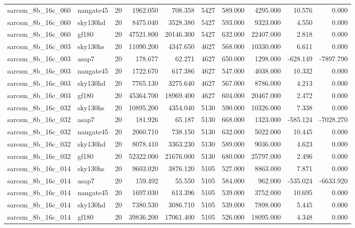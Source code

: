 \begin{tabular}{llrrrrrrrr}
sarcsm\_8b\_16c\_060 & nangate45 & 20 & 1962.050 & 708.358 & 5427 & 589.000 & 4295.000 & 10.576 & 0.000 \\
sarcsm\_8b\_16c\_060 & sky130hd & 20 & 8475.040 & 3528.380 & 5427 & 593.000 & 9323.000 & 4.550 & 0.000 \\
sarcsm\_8b\_16c\_060 & gf180 & 20 & 47521.800 & 20146.300 & 5427 & 632.000 & 22407.000 & 2.818 & 0.000 \\
sarcsm\_8b\_16c\_003 & sky130hs & 20 & 11090.200 & 4347.650 & 4627 & 568.000 & 10330.000 & 6.611 & 0.000 \\
sarcsm\_8b\_16c\_003 & asap7 & 20 & 178.677 & 62.271 & 4627 & 650.000 & 1298.000 & -628.149 & -7897.790 \\
sarcsm\_8b\_16c\_003 & nangate45 & 20 & 1722.670 & 617.386 & 4627 & 547.000 & 4038.000 & 10.332 & 0.000 \\
sarcsm\_8b\_16c\_003 & sky130hd & 20 & 7765.130 & 3275.640 & 4627 & 567.000 & 8786.000 & 4.213 & 0.000 \\
sarcsm\_8b\_16c\_003 & gf180 & 20 & 45364.700 & 18969.400 & 4627 & 604.000 & 20467.000 & 2.472 & 0.000 \\
sarcsm\_8b\_16c\_032 & sky130hs & 20 & 10895.200 & 4354.040 & 5130 & 590.000 & 10326.000 & 7.338 & 0.000 \\
sarcsm\_8b\_16c\_032 & asap7 & 20 & 181.926 & 65.187 & 5130 & 668.000 & 1323.000 & -585.124 & -7028.270 \\
sarcsm\_8b\_16c\_032 & nangate45 & 20 & 2060.710 & 738.150 & 5130 & 632.000 & 5022.000 & 10.445 & 0.000 \\
sarcsm\_8b\_16c\_032 & sky130hd & 20 & 8078.410 & 3363.230 & 5130 & 589.000 & 9036.000 & 4.623 & 0.000 \\
sarcsm\_8b\_16c\_032 & gf180 & 20 & 52322.000 & 21676.000 & 5130 & 680.000 & 25797.000 & 2.496 & 0.000 \\
sarcsm\_8b\_16c\_014 & sky130hs & 20 & 9603.020 & 3876.120 & 5105 & 527.000 & 8863.000 & 7.871 & 0.000 \\
sarcsm\_8b\_16c\_014 & asap7 & 20 & 159.492 & 55.550 & 5105 & 584.000 & 962.000 & -535.024 & -6633.920 \\
sarcsm\_8b\_16c\_014 & nangate45 & 20 & 1697.030 & 613.396 & 5105 & 539.000 & 3752.000 & 10.695 & 0.000 \\
sarcsm\_8b\_16c\_014 & sky130hd & 20 & 7380.530 & 3086.710 & 5105 & 539.000 & 7898.000 & 5.445 & 0.000 \\
sarcsm\_8b\_16c\_014 & gf180 & 20 & 39836.200 & 17061.400 & 5105 & 526.000 & 18095.000 & 4.348 & 0.000 \\

\end{tabular}
